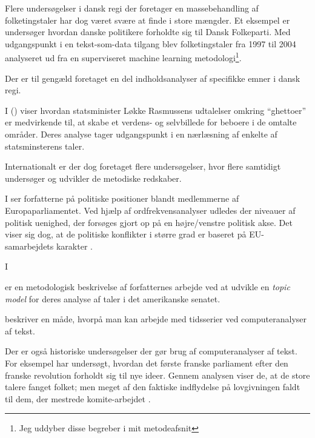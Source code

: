 Flere undersøgelser i dansk regi der foretager en massebehandling af folketingstaler har dog været svære at finde i store mængder.
Et eksempel er \citeauthor{hjorthEstablishmentResponsesPopulist, der} undersøger hvordan danske politikere forholdte sig til Dansk Folkeparti. Med udgangspunkt i en tekst-som-data tilgang blev folketingstaler fra 1997 til 2004 analyseret ud fra en superviseret machine learning metodologi\footnote{Jeg uddyber disse begreber i mit metodeafsnit}.

Der er til gengæld foretaget en del indholdsanalyser af specifikke emner i dansk regi.

I  (\citeyear{andersenTaenkIkkePa2012}) viser \citeauthor{andersenTaenkIkkePa2012} hvordan statsminister Løkke Rasmussens udtalelser omkring “ghettoer” er medvirkende til, at skabe et verdens- og selvbillede for beboere i de omtalte områder.
Deres analyse tager udgangspunkt i en nærlæsning af enkelte af statsminsterens taler.

Internationalt er der dog foretaget flere undersøgelser, hvor flere samtidigt undersøger og udvikler de metodiske redskaber.

I  ser forfatterne på politiske positioner blandt medlemmerne af Europaparliamentet.
Ved hjælp af ordfrekvensanalyser udledes der niveauer af politisk uenighed, der forsøges gjort op på en højre/venstre politisk akse.
Det viser sig dog, at de politiske konflikter i større grad er baseret på EU-samarbejdets karakter \autocite{prokschPositionTakingEuropean2010}.

I  

\autocite{quinnHowAnalyzePolitical2010} er en metodologisk beskrivelse af forfatternes arbejde ved at udvikle en \textit{topic model} for deres analyse af taler i det amerikanske senatet.

\autocite{slapinScalingModelEstimating2008} beskriver en måde, hvorpå man kan arbejde med tidsserier ved computeranalyser af tekst.

Der er også historiske undersøgelser der gør brug af computeranalyser af tekst.
For eksempel har \citeauthor{barronIndividualsInstitutionsInnovation2018} undersøgt, hvordan det første franske parliament efter den franske revolution forholdt sig til nye ideer.
Gennem analysen viser de, at de store talere fanget folket; men meget af den faktiske indflydelse på lovgivningen faldt til dem, der mestrede komite-arbejdet \autocite{barronIndividualsInstitutionsInnovation2018}. 
 
